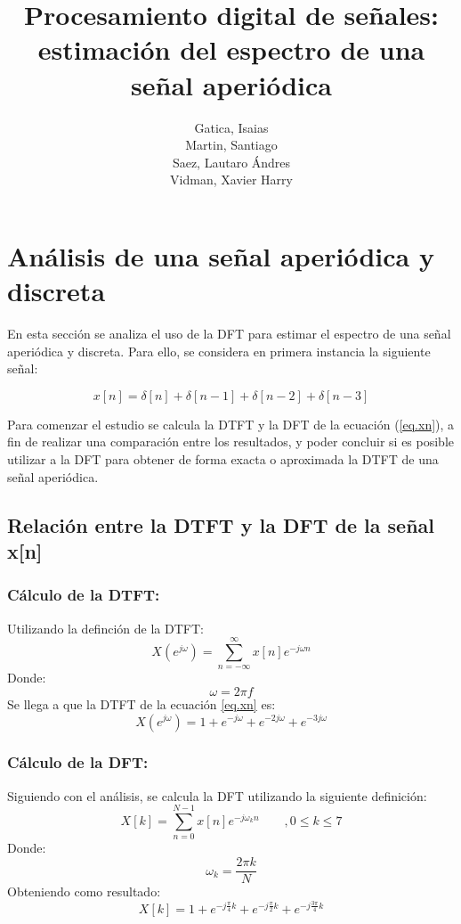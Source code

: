 \documentclass[11pt,a4paper]{article}
\author{Gatica, Isaias \\ Martin, Santiago \\ Saez, Lautaro Ándres \\ Vidman, Xavier Harry}
\title{Procesamiento digital de señales: estimación del espectro de una señal aperiódica}
\date{}
\begin{document}
\maketitle
\section{Análisis de una señal aperiódica y discreta}
\label{secc1}
En esta sección se analiza el uso de la DFT para estimar el espectro de una señal aperiódica y discreta. Para ello, se considera en primera instancia la siguiente señal:

\begin{equation}
    x[n]=\delta[n]+\delta[n-1]+\delta[n-2]+\delta[n-3]
    \label{eq.xn}
\end{equation}

Para comenzar el estudio se calcula la DTFT y la DFT de la ecuación (\ref{eq.xn}), a fin de realizar una comparación entre los resultados, y poder concluir si es posible utilizar a la DFT para obtener de forma exacta o aproximada la DTFT de una señal aperiódica.

    \subsection{Relación entre la DTFT y la DFT de la señal x[n]}

	\subsubsection*{Cálculo de la DTFT:}
    Utilizando la definción de la DTFT:
    \begin{equation}
        X(e^{j\omega})=\sum_{n=-\infty}^{\infty}x[n]e^{-j\omega n}
        \label{eq.DTFT}
    \end{equation}
    Donde: 
    \begin{equation}
        \label{omega}
        \omega=2\pi f
    \end{equation}
    Se llega a que la DTFT de la ecuación \ref{eq.xn} es:
    \begin{equation}
        X(e^{j\omega})=1+e^{-j\omega}+e^{-2j\omega}+e^{-3j\omega}
        \label{DTFT.R}
    \end{equation}
    
	\subsubsection*{Cálculo de la DFT:}
    
    Siguiendo con el análisis, se calcula la DFT utilizando la siguiente definición:
    \begin{equation}
        X[k]=\sum_{n=0}^{N-1}x[n]e^{-j\omega_k n} \qquad , 0 \leq k \leq 7
        \label{eq.DFT}
    \end{equation}
    Donde:
    \begin{equation}
        \label{omega.k}
        \omega_k=\frac{2\pi k}{N}
    \end{equation}
    Obteniendo como resultado:
    \begin{equation}
        \label{DFT.R}
        X[k]=1 + e^{-j \frac{\pi}{4} k} + e^{-j \frac{\pi}{2} k} + e^{-j \frac{3 \pi}{4} k}
    \end{equation}
    
\end{document}
